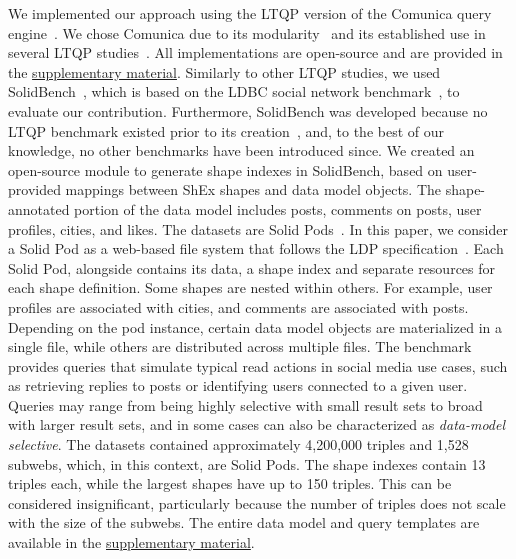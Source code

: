 We implemented our approach using the LTQP version of the Comunica query engine~\cite{taelman_iswc_resources_comunica_2018}.
We chose Comunica due to its modularity~\cite{taelman_swj_componentsjs_2022} and its established use in several LTQP studies~\cite{Bogaerts2021LinkTW, Taelman2023, eschauzier_quweda_linkqueue_2023, Hanski2024, eschauzier_amw_rcubemetric_2024, tam2024opportunitiesshapebasedoptimizationlink}.
All implementations are open-source and are provided in the \hyperref[sec:supplementalMaterial]{supplementary material}.
Similarly to other LTQP studies, we used SolidBench~\cite{Taelman2023}, which is based on the LDBC social network benchmark~\cite{Angles2020}, to evaluate our contribution.
Furthermore, SolidBench was developed because no LTQP benchmark existed prior to its creation~\cite{hartig2018linked, Taelman2023}, and, to the best of our knowledge, no other benchmarks have been introduced since.
We created an open-source module to generate shape indexes in SolidBench, based on user-provided mappings between ShEx shapes and data model objects.
The shape-annotated portion of the data model includes posts, comments on posts, user profiles, cities, and likes.
The datasets are Solid Pods~\cite{sambra_solid_2016, dedecker2022s}.
In this paper, we consider a Solid Pod as a web-based file system that follows the LDP specification~\cite{w3LinkedData}.
Each Solid Pod, alongside contains its data, a shape index and separate resources for each shape definition.
Some shapes are nested within others. 
For example, user profiles are associated with cities, and comments are associated with posts.
Depending on the pod instance, certain data model objects are materialized in a single file, while others are distributed across multiple files.
The benchmark provides queries that simulate typical read actions in social media use cases, such as retrieving replies to posts or identifying users connected to a given user. 
Queries may range from being highly selective with small result sets to broad with larger result sets, and in some cases can also be characterized as \emph{data-model selective}.
The datasets contained approximately 4,200,000 triples and 1,528 subwebs, which, in this context, are Solid Pods.
The shape indexes contain 13 triples each, while the largest shapes have up to 150 triples. 
This can be considered insignificant, particularly because the number of triples does not scale with the size of the subwebs.
The entire data model and query templates are available in the \hyperref[sec:supplementalMaterial]{supplementary material}.

